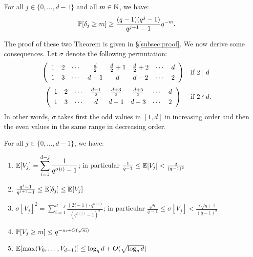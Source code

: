 \documentclass{article}
\begin{document}
\begin{theo}
\label{th:deltaj}
For all $j \in \{0, \ldots, d-1\}$ and all $m \in \N$, we have:
$$\P[\delta_j \geq m] \geq \frac{(q-1)(q^j-1)}{q^{j+1}-1} q^{-m}.$$
\end{theo}

The proof of these two Theorem is given in \S \ref{subsec:proof}. 
We now derive some consequences. Let $\sigma$ denote the following
permutation:
$$\begin{array}{cl}
\left(
\begin{array}{cccccccc}
1 & 2 & \cdots & \frac d 2 & \frac d 2 + 1 & \frac d 2 + 2 & \cdots & d \smallskip \\
1 & 3 & \cdots & d-1 & d & d-2 & \cdots & 2 
\end{array} \right) & \text{if } 2 \mid d \medskip \\
\left(
\begin{array}{cccccccc}
1 & 2 & \cdots & \frac{d+1} 2 & \frac{d+3} 2 & \frac{d+5} 2 & \cdots & d \smallskip \\
1 & 3 & \cdots & d & d-1 & d-3 & \cdots & 2 
\end{array} \right) & \text{if } 2 \nmid d.
\end{array}$$
In other words, $\sigma$ takes first the odd values in $[1,d]$ in 
increasing order and then the even values in the same range in 
decreasing order.

\begin{cor}
\label{cor:Vj}
For all $j \in \{0, \ldots, d-1\}$, we have:

\begin{enumerate}[\hspace{0.3cm}(1)]
\setlength\itemsep{0.1em}
\item $\E[V_j] = 
\displaystyle \sum_{i=1}^{d-j} \frac 1 {q^{\sigma(i)} - 1}$;
in particular $\frac 1 {q-1} \leq \E[V_j] < \frac q {(q-1)^2}$
\item $\frac {q^j - 1}{q^{j+1} - 1} \leq \E[\delta_j] \leq \E[V_j]$
\item $\sigma[V_j]^2 = 
\displaystyle \sum_{i=1}^{d-j} \frac {(2i-1) \cdot q^{\sigma(i)}}
{(q^{\sigma(i)} - 1)^2}$;
in particular $\frac{\sqrt q}{q-1} \leq \sigma[V_j] < 
\frac {q \:\sqrt{q+1}} {(q-1)^2}$
\item $\P[V_j \geq m] \leq q^{-m + O(\sqrt m)}$
\item $\E[\max(V_0, \ldots, V_{d-1})] \leq \log_q d + O(\sqrt{\log_q d})$
\end{enumerate}
\end{cor}
\end{document}
